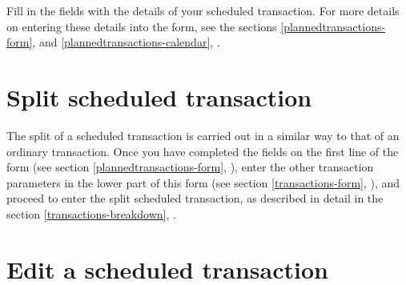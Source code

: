 Fill in the fields with the details of your scheduled transaction. For more details on entering these details into the form, see the sections \vref{plannedtransactions-form},  and \vref{plannedtransactions-calendar}, .


\section{Split scheduled transaction\label{plannedtransactions-breakdown}}

The split of a scheduled transaction is carried out in a similar way to that of an ordinary transaction. Once you have completed the fields on the first line of the form (see section \vref{plannedtransactions-form}, ), enter the other transaction parameters in the lower part of this form (see section \vref{transactions-form}, ), and proceed to enter the split scheduled transaction, as described in detail in the section \vref{transactions-breakdown}, .


\section{Edit a scheduled transaction\label{plannedtransactions-modify}}

